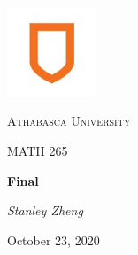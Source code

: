 \documentclass[11pt, letterpaper, twoside]{article}
\begin{document}
\begin{titlepage}
\centering
\vspace*{60px}
\hspace{0pt}
\includegraphics[width=0.2\textwidth]{logo}\par\vspace{1cm}
{\scshape\LARGE Athabasca University \par}
\vspace{1cm}
{\scshape\Large MATH 265\par}
\vspace{1.5cm}
{\huge\bfseries Final\par}
\vspace{2cm}
{\Large\itshape Stanley Zheng \par}
\vfill
{\large October 23, 2020\par}
\vspace*{50px}
\hspace{0pt}
\pagebreak
\end{titlepage}
\end{document}
